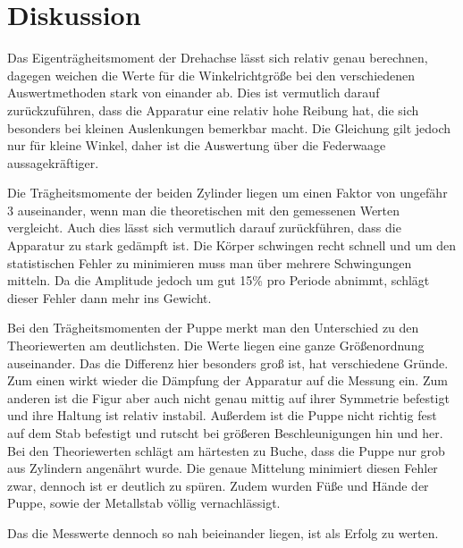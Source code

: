 \section{Diskussion}
Das Eigenträgheitsmoment der Drehachse lässt sich relativ genau berechnen, dagegen weichen die Werte für die Winkelrichtgröße bei den verschiedenen Auswertmethoden stark von einander ab. Dies ist vermutlich darauf zurückzuführen, dass die Apparatur eine relativ hohe Reibung hat, die sich besonders bei kleinen Auslenkungen bemerkbar macht. Die Gleichung gilt jedoch nur für kleine Winkel, daher ist die Auswertung über die Federwaage aussagekräftiger.

Die Trägheitsmomente der beiden Zylinder liegen um einen Faktor von ungefähr 3 auseinander, wenn man die theoretischen mit den gemessenen Werten vergleicht. Auch dies lässt sich vermutlich darauf zurückführen, dass die Apparatur zu stark gedämpft ist. Die Körper schwingen recht schnell und um den statistischen Fehler zu minimieren muss man über mehrere Schwingungen mitteln. Da die Amplitude jedoch um gut 15\% pro Periode abnimmt, schlägt dieser Fehler dann mehr ins Gewicht.

Bei den Trägheitsmomenten der Puppe merkt man den Unterschied zu den Theoriewerten am deutlichsten. Die Werte liegen eine ganze Größenordnung auseinander. Das die Differenz hier besonders groß ist, hat verschiedene Gründe. Zum einen wirkt wieder die Dämpfung der Apparatur auf die Messung ein. Zum anderen ist die Figur aber auch nicht genau mittig auf ihrer Symmetrie befestigt und ihre Haltung ist relativ instabil. Außerdem ist die Puppe nicht richtig fest auf dem Stab befestigt und rutscht bei größeren Beschleunigungen hin und her.
Bei den Theoriewerten schlägt am härtesten zu Buche, dass die Puppe nur grob aus Zylindern angenährt wurde. Die genaue Mittelung minimiert diesen Fehler zwar, dennoch ist er deutlich zu spüren. Zudem wurden Füße und Hände der Puppe, sowie der Metallstab völlig vernachlässigt.

Das die Messwerte dennoch so nah beieinander liegen, ist als Erfolg zu werten.




